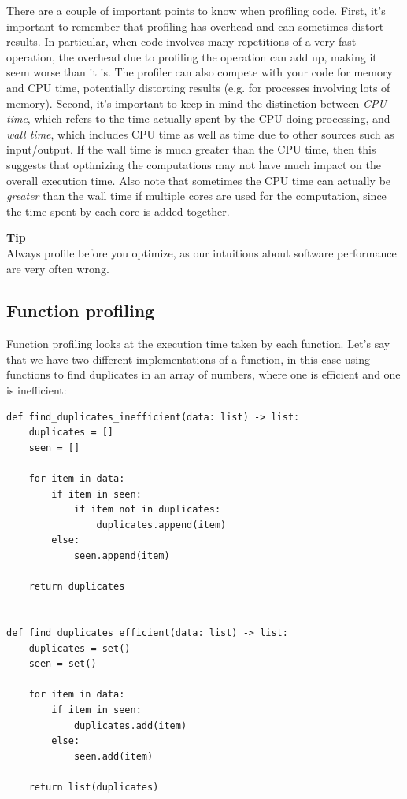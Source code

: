 There are a couple of important points to know when profiling code. First, it's important to remember that profiling has overhead and can sometimes distort results. In particular, when code involves many repetitions of a very fast operation, the overhead due to profiling the operation can add up, making it seem worse than it is.  The profiler can also compete with your code for memory and CPU time, potentially distorting results (e.g. for processes involving lots of memory).  Second, it's important to keep in mind the distinction between \textit{CPU time}, which refers to the time actually spent by the CPU doing processing, and \textit{wall time}, which includes CPU time as well as time due to other sources such as input/output. If the wall time is much greater than the CPU time, then this suggests that optimizing the computations may not have much impact on the overall execution time.  Also note that sometimes the CPU time can actually be \textit{greater} than the wall time if multiple cores are used for the computation, since the time spent by each core is added together.

\begin{framed}
\textbf{Tip}\\
Always profile before you optimize, as our intuitions about software performance are very often wrong.
\end{framed}

\subsection{Function profiling}

Function profiling looks at the execution time taken by each function.  Let's say that we have two different implementations of a function, in this case using functions to find duplicates in an array of numbers, where one is efficient and one is inefficient:

\begin{lstlisting}[style=Python]
def find_duplicates_inefficient(data: list) -> list:
    duplicates = []
    seen = []
    
    for item in data:
        if item in seen:  
            if item not in duplicates:  
                duplicates.append(item)
        else:
            seen.append(item)
    
    return duplicates


def find_duplicates_efficient(data: list) -> list:
    duplicates = set()
    seen = set()
    
    for item in data:
        if item in seen:
            duplicates.add(item)
        else:
            seen.add(item)
    
    return list(duplicates)
\end{lstlisting}

